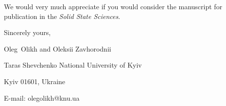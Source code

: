 \documentclass[preprint]{elsarticle}
\begin{document}
We would  very much appreciate if you would consider the manuscript for publication in the \emph{Solid State Sciences}.

%


\vspace{3mm}

Sincerely yours,

Oleg~Olikh and Oleksii Zavhorodnii


Taras Shevchenko National University of Kyiv


Kyiv 01601, Ukraine

E-mail: olegolikh@knu.ua
\end{document}
